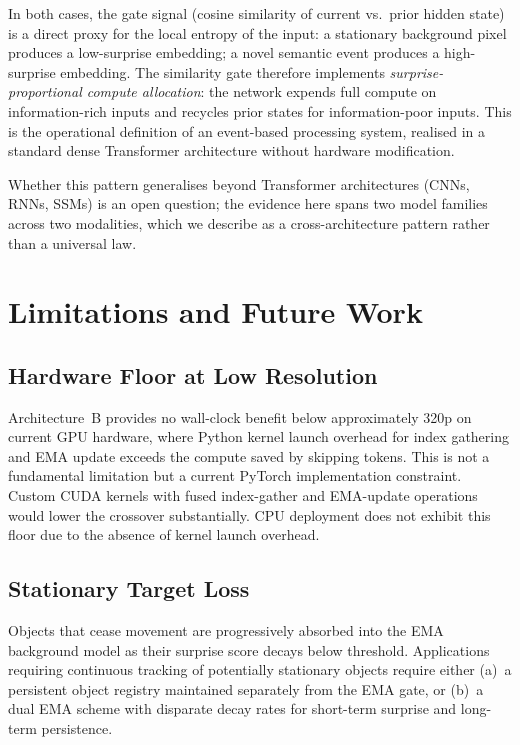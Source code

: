 \documentclass{article}
\begin{document}
In both cases, the gate signal (cosine similarity of current vs.\ prior
hidden state) is a direct proxy for the local entropy of the input: a
stationary background pixel produces a low-surprise embedding; a novel
semantic event produces a high-surprise embedding. The similarity gate
therefore implements \emph{surprise-proportional compute allocation}:
the network expends full compute on information-rich inputs and recycles
prior states for information-poor inputs. This is the operational
definition of an event-based processing system, realised in a standard
dense Transformer architecture without hardware modification.

Whether this pattern generalises beyond Transformer architectures
(CNNs, RNNs, SSMs) is an open question; the evidence here spans two
model families across two modalities, which we describe as a
cross-architecture pattern rather than a universal law.

\section{Limitations and Future Work}\label{limitations-and-future-work}

\subsection{Hardware Floor at Low Resolution}
\label{sec:hardware-floor}

Architecture~B provides no wall-clock benefit below approximately 320p on
current GPU hardware, where Python kernel launch overhead for index gathering
and EMA update exceeds the compute saved by skipping tokens. This is not a
fundamental limitation but a current PyTorch implementation constraint.
Custom CUDA kernels with fused index-gather and EMA-update operations would
lower the crossover substantially. CPU deployment does not exhibit this floor
due to the absence of kernel launch overhead.

\subsection{Stationary Target Loss}
\label{sec:stationary-target-loss}

Objects that cease movement are progressively absorbed into the EMA
background model as their surprise score decays below threshold.
Applications requiring continuous tracking of potentially stationary
objects require either (a)~a persistent object registry maintained
separately from the EMA gate, or (b)~a dual EMA scheme with disparate
decay rates for short-term surprise and long-term persistence.
\end{document}
